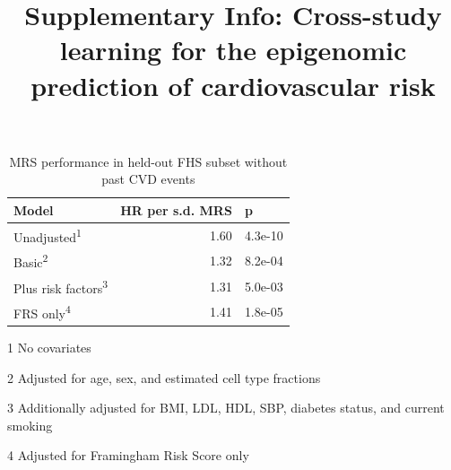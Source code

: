 \documentclass[]{article}
\title{Supplementary Info: Cross-study learning for the epigenomic prediction of cardiovascular risk}
\author{}
\date{}
\begin{document}
\maketitle

\newcommand{\beginsupplement}{
  \setcounter{table}{0}  
  \renewcommand{\thetable}{S\arabic{table}} 
  \setcounter{figure}{0} 
  \renewcommand{\thefigure}{S\arabic{figure}}
}

\setcounter{table}{0}  
  \renewcommand{\thetable}{S\arabic{table}} 
  \setcounter{figure}{0} 
  \renewcommand{\thefigure}{S\arabic{figure}}

\begin{table}[t]

\caption{\label{tab:fhs-holdout-noPE}MRS performance in held-out FHS subset without past CVD events}
\centering
\begin{threeparttable}
\begin{tabular}{lrl}
\toprule
Model & HR per s.d. MRS & p\\
\midrule
Unadjusted\textsuperscript{1} & 1.60 & 4.3e-10\\
Basic\textsuperscript{2} & 1.32 & 8.2e-04\\
Plus risk factors\textsuperscript{3} & 1.31 & 5.0e-03\\
FRS only\textsuperscript{4} & 1.41 & 1.8e-05\\
\bottomrule
\end{tabular}
\begin{tablenotes}
\item[1] No covariates
\item[2] Adjusted for age, sex, and estimated cell type fractions
\item[3] Additionally adjusted for BMI, LDL, HDL, SBP, diabetes status, and current smoking
\item[4] Adjusted for Framingham Risk Score only
\end{tablenotes}
\end{threeparttable}
\end{table}
\end{document}
